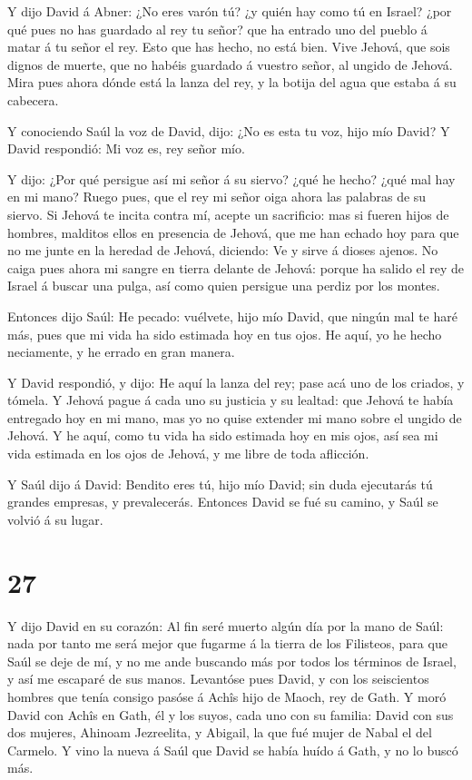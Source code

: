  Y dijo David á Abner: ¿No eres varón tú? ¿y quién hay como
tú en Israel? ¿por qué pues no has guardado al rey tu señor? que ha
entrado uno del pueblo á matar á tu señor el rey.  Esto que
has hecho, no está bien. Vive Jehová, que sois dignos de muerte, que no
habéis guardado á vuestro señor, al ungido de Jehová. Mira pues ahora
dónde está la lanza del rey, y la botija del agua que estaba á su
cabecera.

 Y conociendo Saúl la voz de David, dijo: ¿No es esta tu
voz, hijo mío David? Y David respondió: Mi voz es, rey señor mío.

 Y dijo: ¿Por qué persigue así mi señor á su siervo? ¿qué
he hecho? ¿qué mal hay en mi mano?  Ruego pues, que el rey
mi señor oiga ahora las palabras de su siervo. Si Jehová te incita
contra mí, acepte un sacrificio: mas si fueren hijos de hombres,
malditos ellos en presencia de Jehová, que me han echado hoy para que no
me junte en la heredad de Jehová, diciendo: Ve y sirve á dioses ajenos.
 No caiga pues ahora mi sangre en tierra delante de Jehová:
porque ha salido el rey de Israel á buscar una pulga, así como quien
persigue una perdiz por los montes.

 Entonces dijo Saúl: He pecado: vuélvete, hijo mío David,
que ningún mal te haré más, pues que mi vida ha sido estimada hoy en tus
ojos. He aquí, yo he hecho neciamente, y he errado en gran manera.

 Y David respondió, y dijo: He aquí la lanza del rey; pase
acá uno de los criados, y tómela.  Y Jehová pague á cada
uno su justicia y su lealtad: que Jehová te había entregado hoy en mi
mano, mas yo no quise extender mi mano sobre el ungido de Jehová.
 Y he aquí, como tu vida ha sido estimada hoy en mis ojos,
así sea mi vida estimada en los ojos de Jehová, y me libre de toda
aflicción.

 Y Saúl dijo á David: Bendito eres tú, hijo mío David; sin
duda ejecutarás tú grandes empresas, y prevalecerás. Entonces David se
fué su camino, y Saúl se volvió á su lugar.

\hypertarget{section-26}{%
\section{27}\label{section-26}}

 Y dijo David en su corazón: Al fin seré muerto algún día
por la mano de Saúl: nada por tanto me será mejor que fugarme á la
tierra de los Filisteos, para que Saúl se deje de mí, y no me ande
buscando más por todos los términos de Israel, y así me escaparé de sus
manos.  Levantóse pues David, y con los seiscientos hombres
que tenía consigo pasóse á Achîs hijo de Maoch, rey de Gath.
 Y moró David con Achîs en Gath, él y los suyos, cada uno
con su familia: David con sus dos mujeres, Ahinoam Jezreelita, y
Abigail, la que fué mujer de Nabal el del Carmelo.  Y vino
la nueva á Saúl que David se había huído á Gath, y no lo buscó más.

